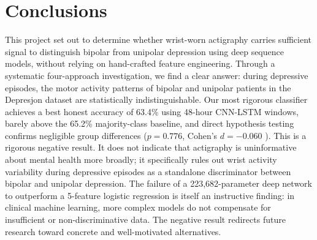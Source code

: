 \section{Conclusions}
\label{sec:conclusions}

This project set out to determine whether wrist-worn actigraphy carries sufficient signal to distinguish bipolar from unipolar depression using deep sequence models, without relying on hand-crafted feature engineering. Through a systematic four-approach investigation, we find a clear answer: during depressive episodes, the motor activity patterns of bipolar and unipolar patients in the Depresjon dataset are statistically indistinguishable. Our most rigorous classifier achieves a best honest accuracy of 63.4\% using 48-hour CNN-LSTM windows, barely above the 65.2\% majority-class baseline, and direct hypothesis testing confirms negligible group differences ($p = 0.776$, Cohen's $d = {-}0.060$ \cite{cohen1988statistical}). This is a rigorous negative result. It does not indicate that actigraphy is uninformative about mental health more broadly; it specifically rules out wrist activity variability during depressive episodes as a standalone discriminator between bipolar and unipolar depression. The failure of a 223,682-parameter deep network \cite{paszke2019pytorch} to outperform a 5-feature logistic regression \cite{pedregosa2011sklearn} is itself an instructive finding: in clinical machine learning, more complex models do not compensate for insufficient or non-discriminative data. The negative result redirects future research toward concrete and well-motivated alternatives.


